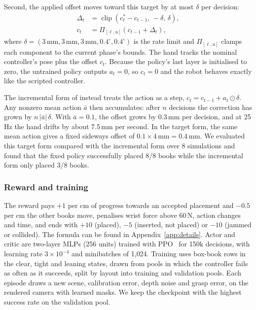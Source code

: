 \documentclass{article}
\begin{document}
Second, the applied offset moves toward this target by at most $\delta$ per
decision:
\begin{align}
  \Delta_t &= \operatorname{clip}\!\left(c^\ast_t - c_{t-1},\, -\delta,\, \delta\right),
  \label{eq:step}\\
  c_t &= \Pi_{[\ell,u]}\!\left(c_{t-1} + \Delta_t\right),
  \label{eq:offset}
\end{align}
where $\delta = (3\,\text{mm}, 3\,\text{mm}, 3\,\text{mm}, 0.4^\circ, 0.4^\circ)$
is the rate limit and $\Pi_{[\ell,u]}$ clamps each component to the current
phase's bounds. The hand tracks the nominal controller's
pose plus the offset $c_t$. Because the policy's last layer is initialised to zero, the untrained policy outputs $a_t = 0$, so $c_t = 0$ and the robot
behaves exactly like the scripted controller.

The incremental form of \citet{liu2026residual} instead treats the action as a
step, $c_t = c_{t-1} + a_t \odot \delta$. Any nonzero mean action $\bar a$
then accumulates: after $n$ decisions the correction has grown by
$n\,|\bar a|\,\delta$. With $\bar a = 0.1$, the offset grows by 0.3\,mm per
decision, and at 25\,Hz the hand drifts by about 7.5\,mm per second. In the target form, the same mean action
gives a fixed sideways offset of $0.1 \times 4\,\text{mm} = 0.4$\,mm. We evaluated this target form compared with the incremental form over 8 simulations and found that the fixed policy successfully placed 8/8 books while the incremental form only placed 3/8 books.

\subsubsection{Reward and training}
The reward pays $+1$ per cm of progress towards an accepted placement and
$-0.5$ per cm the other books move, penalises wrist force above 60\,N, action changes and time, and ends
with $+10$ (placed), $-5$ (inserted, not placed) or $-10$ (jammed or collided). The formula can be found in Appendix~\ref{app:details}. Actor and critic are two-layer MLPs (256 units) trained with
PPO~\citep{schulman2017ppo} for 150k decisions, with learning rate $3 \times 10^{-4}$ and minibatches of
1{,}024. Training uses box-book rows in the clear, tight and leaning states, drawn from pools in which the
controller fails as often as it succeeds, split by layout into training and validation pools. Each episode
draws a new scene, calibration error, depth noise and grasp error, on the rendered camera with learned
masks. We keep the checkpoint with the highest success rate on the validation pool.
\end{document}
